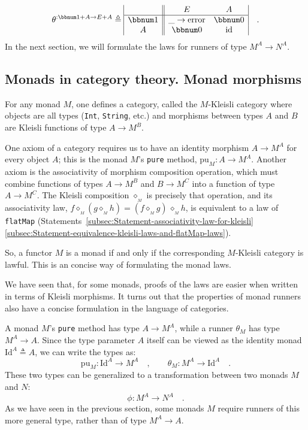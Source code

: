 ~\vspace{-1\baselineskip}
\[
\theta^{:\bbnum 1+A\rightarrow E+A}\triangleq\begin{array}{|c||cc|}
 & E & A\\
\hline \bbnum 1 & \_\rightarrow\text{error} & \bbnum 0\\
A & \bbnum 0 & \text{id}
\end{array}\quad.
\]
In the next section, we will formulate the laws for runners of type
$M^{A}\rightarrow N^{A}$.

\subsection{Monads in category theory. Monad morphisms\label{subsec:Monads-in-category-theory-monad-morphisms}}

For any monad $M$, one defines a category, called the $M$-Kleisli
category where objects are all types (\lstinline!Int!, \lstinline!String!,
etc.) and morphisms between types $A$ and $B$ are Kleisli functions
of type $A\rightarrow M^{B}$. 

One axiom of a category requires us to have an identity morphism $A\rightarrow M^{A}$
for every object $A$; this is the monad $M$\textsf{'}s \lstinline!pure!
method, $\text{pu}_{M}:A\rightarrow M^{A}$. Another axiom is the
associativity of morphism composition operation, which must combine
functions of types $A\rightarrow M^{B}$ and $B\rightarrow M^{C}$
into a function of type $A\rightarrow M^{C}$. The Kleisli composition
$\diamond_{_{M}}$ is precisely that operation, and its associativity
law, $f\diamond_{_{M}}(g\diamond_{_{M}}h)=(f\diamond_{_{M}}g)\,\diamond_{_{M}}h$,
is equivalent to a law of \lstinline!flatMap! (Statements~\ref{subsec:Statement-associativity-law-for-kleisli}\textendash \ref{subsec:Statement-equivalence-kleisli-laws-and-flatMap-laws}).

So, a functor $M$ is a monad if and only if the corresponding $M$-Kleisli
category is lawful. This is an concise way of formulating the monad
laws.

We have seen that, for some monads, proofs of the laws are easier
when written in terms of Kleisli morphisms. It turns out that the
properties of monad runners also have a concise formulation in the
language of categories.

A monad $M$\textsf{'}s \lstinline!pure! method has type $A\rightarrow M^{A}$,
while a runner $\theta_{M}$ has type $M^{A}\rightarrow A$. Since
the type parameter $A$ itself can be viewed as the identity monad
$\text{Id}^{A}\triangleq A$, we can write the types as:
\[
\text{pu}_{M}:\text{Id}^{A}\rightarrow M^{A}\quad,\quad\quad\theta_{M}:M^{A}\rightarrow\text{Id}^{A}\quad.
\]
 These two types can be generalized to a transformation between two
monads $M$ and $N$:
\[
\phi:M^{A}\rightarrow N^{A}\quad.
\]
As we have seen in the previous section, some monads $M$ require
runners of this more general type, rather than of type $M^{A}\rightarrow A$.

